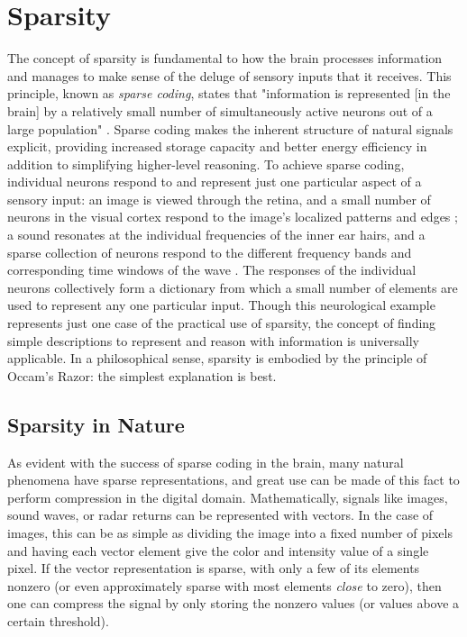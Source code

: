\section{Sparsity}
\label{intro_sparsity}
The concept of sparsity is fundamental to how the brain processes information and manages to make sense of the deluge of sensory inputs that it receives. This principle, known as \emph{sparse coding}, states that "information is represented [in the brain] by a relatively small number of simultaneously active neurons out of a large population" \autocite{OF04}. Sparse coding makes the inherent structure of natural signals explicit, providing increased storage capacity and better energy efficiency in addition to simplifying higher-level reasoning. To achieve sparse coding, individual neurons respond to and represent just one particular aspect of a sensory input: an image is viewed through the retina, and a small number of neurons in the visual cortex respond to the image's localized patterns and edges \autocite{OF97}; a sound resonates at the individual frequencies of the inner ear hairs, and a sparse collection of neurons respond to the different frequency bands and corresponding time windows of the wave \autocite{Lew02}. The responses of the individual neurons collectively form a dictionary from which a small number of elements are used to represent any one particular input. Though this neurological example represents just one case of the practical use of sparsity, the concept of finding simple descriptions to represent and reason with information is universally applicable. In a philosophical sense, sparsity is embodied by the principle of Occam's Razor: the simplest explanation is best.

\subsection{Sparsity in Nature}
\label{intro_natural_sparsity}
As evident with the success of sparse coding in the brain, many natural phenomena have sparse representations, and great use can be made of this fact to perform compression in the digital domain. Mathematically, signals like images, sound waves, or radar returns can be represented with vectors. In the case of images, this can be as simple as dividing the image into a fixed number of pixels and having each vector element give the color and intensity value of a single pixel. If the vector representation is sparse, with only a few of its elements nonzero (or even approximately sparse with most elements \emph{close} to zero), then one can compress the signal by only storing the nonzero values (or values above a certain threshold).

